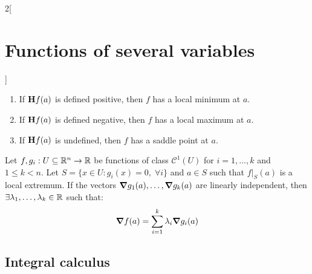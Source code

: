 \documentclass[../../../main.tex]{subfiles}
\begin{document}
\begin{multicols}{2}[\section{Functions of several variables}]
\begin{theorem}
    \begin{enumerate}
      \item If $\boldsymbol{\mathrm{H}}f(a)$ is defined positive, then $f$ has a local minimum at $a$.
      \item If $\boldsymbol{\mathrm{H}}f(a)$ is defined negative, then $f$ has a local maximum at $a$.
      \item If $\boldsymbol{\mathrm{H}}f(a)$ is undefined, then $f$ has a saddle point at $a$.
    \end{enumerate}
  \end{theorem}
  \begin{theorem}
    Let $f,g_i:U\subseteq\mathbb{R}^n\rightarrow\mathbb{R} $ be functions of class $\mathcal{C}^1(U)$ for $i=1,\ldots,k$ and $1\leq k<n$. Let $S=\{x\in U:g_i(x)=0,\;\forall i\}$ and $a\in S$ such that $f|_S(a)$ is a local extremum. If the vectors $\grad g_1(a),\ldots,\grad g_k(a)$ are linearly independent, then $\exists\lambda_1,\ldots,\lambda_k\in\mathbb{R} $ such that: $$\grad f(a)=\sum_{i=1}^k\lambda_i\grad g_i(a)$$
  \end{theorem}
  \subsection{Integral calculus}

\end{multicols}
\end{document}
